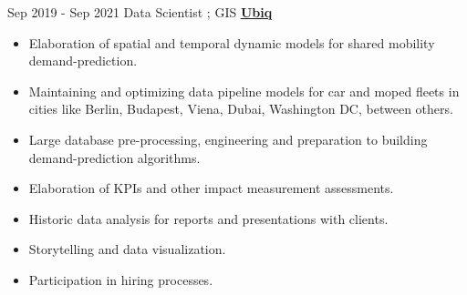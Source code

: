 \documentclass[letterpaper]{twentysecondcv} %
\begin{document}
\begin{twenty}
\twentyitem
    	{Sep 2019 -}
		{Sep 2021}
        {Data Scientist ; GIS} 
        {\href{http://www.ubiq.ai/}{\normalsize \textbf{\underline{Ubiq}}}}
        {}
        {\begin{itemize}
        
        \item Elaboration of spatial and temporal dynamic models for shared mobility demand-prediction. 
        \item Maintaining and optimizing data pipeline models for car and moped fleets in cities like Berlin, Budapest, Viena, Dubai, Washington DC, between others. \item Large database pre-processing, engineering and preparation to building demand-prediction algorithms.
        \item Elaboration of KPIs and other impact measurement assessments.
        \item Historic data analysis for reports and presentations with clients.
        \item Storytelling and data visualization.
        
        \item Participation in hiring processes. \\
        
         \hspace{2mm}
          \hspace{2mm} 
          \hspace{2mm} 
          \hspace{2mm}  \hspace{2mm} 
        
        \end{itemize}}
	

\end{twenty}
\end{document}
